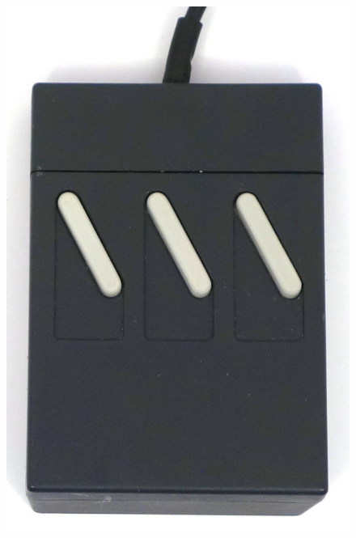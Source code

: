\documentclass[11pt, a4paper]{article}
\begin{document}
\begin{figure}[h]
    \centering
    \includegraphics[scale=0.4]{1983_logitech_logimouse_p5/top_30.jpg}

\end{figure}
\end{document}
